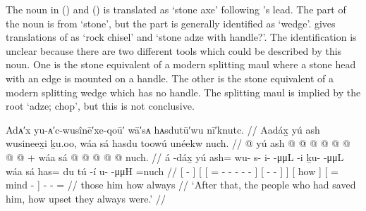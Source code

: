 The noun  in (\blastx) and (\lastx) is translated as ‘stone axe’ following \citeauthor{swanton:1909}’s lead.
The  part of the noun is from  ‘stone’, but the  part is generally identified as ‘wedge’.
\textcite[03/210]{leer:1973} gives translations of  as ‘rock chisel’ and ‘stone adze with handle?’.
The identification is unclear because there are two different tools which could be described by this noun.
One is the stone equivalent of a modern splitting maul where a stone head with an edge is mounted on a handle.
The other is the stone equivalent of a modern splitting wedge which has no handle.
The splitting maul is implied by the root  ‘adze; chop’, but this is not conclusive.

\ex\label{ex:106-23-upset}%
%
\begingl
	\glpreamble	Adᴀ′x yu-ᴀ′c-wusînē′xe-qoū′ wā′sᴀ hᴀsdutū′wu nī′knutc. //
	\glpreamble	Aadáx̱ yú ash wusineex̱i ḵu.oo, wáa sá hasdu toowú unéekw nuch. //
	\gla	{}  @ {} {} 
			{} yú {} ash @  @ {} @ {} @ {} @ {} @ {} {} 
				{}  @ {} @ {} {} {} +
			{} wáa sá {} {}  @ {}  @ {} {}
			 @ {} @ {} @ \•nuch. //
	\glb	{} á -dáx̱ {}
			{} yú {} ash= wu- s- i-  -μμL -i {} 
				{} ḵu-  -μμL {} {}
			{} wáa sá {} {} has= du tú -í {}
			u-  -μμH =nuch //
	\glc	{}[  - {}]
			{}[  {}[ = - - -
					 - - {}]
				{}[ -  - {}] {}]
			{}[ how  {}] {}[ =  mind - {}]
			-  - = //
	\gld	{}  {} {}
			{} those {} him  {} {} {} {} {} {}
				{}  {} {} {} {}
			{} how {} {} {}  {}  {} {}
			 {} {} \•always //
	\glft	‘After that, the people who had saved him, how upset they always were.’
		//
\endgl
\xe

